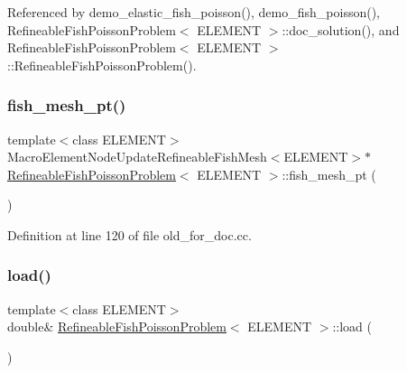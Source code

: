Referenced by demo\+\_\+elastic\+\_\+fish\+\_\+poisson(), demo\+\_\+fish\+\_\+poisson(), Refineable\+Fish\+Poisson\+Problem$<$ E\+L\+E\+M\+E\+N\+T $>$\+::doc\+\_\+solution(), and Refineable\+Fish\+Poisson\+Problem$<$ E\+L\+E\+M\+E\+N\+T $>$\+::\+Refineable\+Fish\+Poisson\+Problem().

\mbox{\label{classRefineableFishPoissonProblem_ab472201df89d71930157fbc45b8eaa54}} 
\subsubsection{\texorpdfstring{fish\+\_\+mesh\+\_\+pt()}{fish\_mesh\_pt()}\hspace{0.1cm}{\footnotesize\ttfamily [2/2]}}
{\footnotesize\ttfamily template$<$class E\+L\+E\+M\+E\+NT$>$ \\
Macro\+Element\+Node\+Update\+Refineable\+Fish\+Mesh$<$E\+L\+E\+M\+E\+NT$>$$\ast$ \hyperlink{classRefineableFishPoissonProblem}{Refineable\+Fish\+Poisson\+Problem}$<$ E\+L\+E\+M\+E\+NT $>$\+::fish\+\_\+mesh\+\_\+pt (\begin{DoxyParamCaption}{ }\end{DoxyParamCaption})\hspace{0.3cm}{\ttfamily [inline]}}



Definition at line 120 of file old\+\_\+for\+\_\+doc.\+cc.

\mbox{\label{classRefineableFishPoissonProblem_a20702e8945d442c9597348b550da14e4}} 
\subsubsection{\texorpdfstring{load()}{load()}\hspace{0.1cm}{\footnotesize\ttfamily [1/2]}}
{\footnotesize\ttfamily template$<$class E\+L\+E\+M\+E\+NT$>$ \\
double\& \hyperlink{classRefineableFishPoissonProblem}{Refineable\+Fish\+Poisson\+Problem}$<$ E\+L\+E\+M\+E\+NT $>$\+::load (\begin{DoxyParamCaption}{ }\end{DoxyParamCaption})\hspace{0.3cm}{\ttfamily [inline]}}




